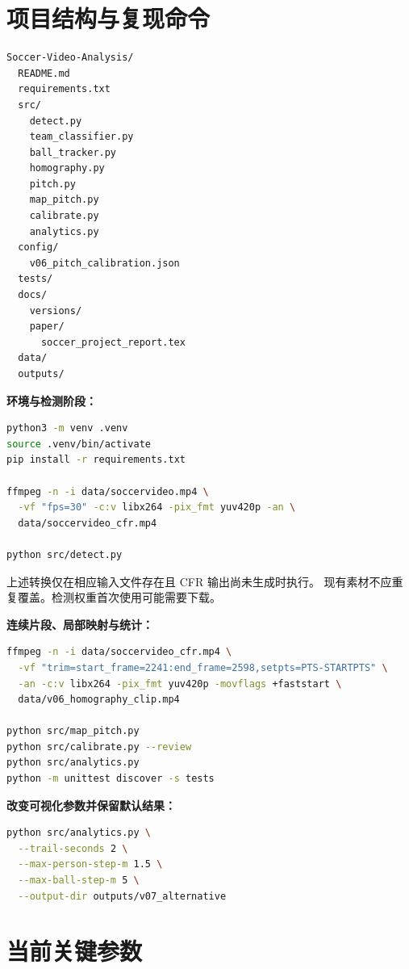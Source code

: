 \documentclass[UTF8,fontset=fandol,11pt,a4paper]{ctexart}
\begin{document}
\appendix
\section{项目结构与复现命令}

\begin{lstlisting}
Soccer-Video-Analysis/
  README.md
  requirements.txt
  src/
    detect.py
    team_classifier.py
    ball_tracker.py
    homography.py
    pitch.py
    map_pitch.py
    calibrate.py
    analytics.py
  config/
    v06_pitch_calibration.json
  tests/
  docs/
    versions/
    paper/
      soccer_project_report.tex
  data/
  outputs/
\end{lstlisting}

\noindent\textbf{环境与检测阶段：}
\begin{lstlisting}[language=bash]
python3 -m venv .venv
source .venv/bin/activate
pip install -r requirements.txt

ffmpeg -n -i data/soccervideo.mp4 \
  -vf "fps=30" -c:v libx264 -pix_fmt yuv420p -an \
  data/soccervideo_cfr.mp4

python src/detect.py
\end{lstlisting}
上述转换仅在相应输入文件存在且 CFR 输出尚未生成时执行。
现有素材不应重复覆盖。检测权重首次使用可能需要下载。

\noindent\textbf{连续片段、局部映射与统计：}
\begin{lstlisting}[language=bash]
ffmpeg -n -i data/soccervideo_cfr.mp4 \
  -vf "trim=start_frame=2241:end_frame=2598,setpts=PTS-STARTPTS" \
  -an -c:v libx264 -pix_fmt yuv420p -movflags +faststart \
  data/v06_homography_clip.mp4

python src/map_pitch.py
python src/calibrate.py --review
python src/analytics.py
python -m unittest discover -s tests
\end{lstlisting}

\noindent\textbf{改变可视化参数并保留默认结果：}
\begin{lstlisting}[language=bash]
python src/analytics.py \
  --trail-seconds 2 \
  --max-person-step-m 1.5 \
  --max-ball-step-m 5 \
  --output-dir outputs/v07_alternative
\end{lstlisting}

\section{当前关键参数}
\end{document}
